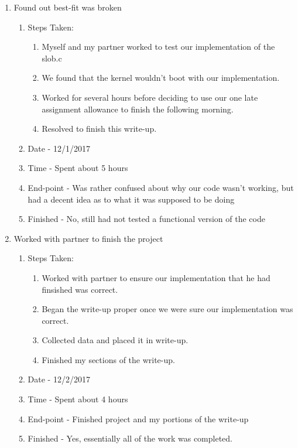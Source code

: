 \documentclass[journal,10pt,onecolumn,compsoc]{IEEEtran} \usepackage[margin=1.0in]{geometry} \usepackage{pdfpages}
\begin{document}
\begin{enumerate}
	\item Found out best-fit was broken
		\begin{enumerate}
			\item Steps Taken:
				\begin{enumerate}
					\item Myself and my partner worked to test our implementation of the slob.c
                    \item We found that the kernel wouldn't boot with our implementation.
                    \item Worked for several hours before deciding to use our one late assignment allowance to finish the following morning.
                    \item Resolved to finish this write-up.
				\end{enumerate}
			\item Date - 12/1/2017
			\item Time - Spent about 5 hours
			\item End-point - Was rather confused about why our code wasn't working, but had a decent idea as to what it was supposed to be doing
			\item Finished - No, still had not tested a functional version of the code \\
		\end {enumerate}
        
	\item Worked with partner to finish the project
		\begin{enumerate}
			\item Steps Taken:
				\begin{enumerate}
					\item Worked with partner to ensure our implementation that he had finsished was correct.
                    \item Began the write-up proper once we were sure our implementation was correct.
                    \item Collected data and placed it in write-up.
                    \item Finished my sections of the write-up.
				\end{enumerate}
			\item Date - 12/2/2017
			\item Time - Spent about 4 hours
			\item End-point - Finished project and my portions of the write-up
			\item Finished - Yes, essentially all of the work was completed. \\
		\end {enumerate}
    \end{enumerate}
	
\end{document}

